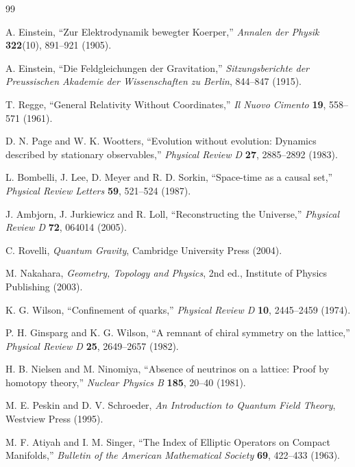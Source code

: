\documentclass[11pt,a4paper]{article}
\begin{document}
\begin{thebibliography}{99}

A. Einstein, ``Zur Elektrodynamik bewegter Koerper,'' \emph{Annalen der Physik} \textbf{322}(10), 891--921 (1905).

A. Einstein, ``Die Feldgleichungen der Gravitation,'' \emph{Sitzungsberichte der Preussischen Akademie der Wissenschaften zu Berlin}, 844--847 (1915).

T. Regge, ``General Relativity Without Coordinates,'' \emph{Il Nuovo Cimento} \textbf{19}, 558--571 (1961).

D. N. Page and W. K. Wootters, ``Evolution without evolution: Dynamics described by stationary observables,'' \emph{Physical Review D} \textbf{27}, 2885--2892 (1983).

L. Bombelli, J. Lee, D. Meyer and R. D. Sorkin, ``Space-time as a causal set,'' \emph{Physical Review Letters} \textbf{59}, 521--524 (1987).

J. Ambjorn, J. Jurkiewicz and R. Loll, ``Reconstructing the Universe,'' \emph{Physical Review D} \textbf{72}, 064014 (2005).

C. Rovelli, \emph{Quantum Gravity}, Cambridge University Press (2004).

M. Nakahara, \emph{Geometry, Topology and Physics}, 2nd ed., Institute of Physics Publishing (2003).

K. G. Wilson, ``Confinement of quarks,'' \emph{Physical Review D} \textbf{10}, 2445--2459 (1974).

P. H. Ginsparg and K. G. Wilson, ``A remnant of chiral symmetry on the lattice,'' \emph{Physical Review D} \textbf{25}, 2649--2657 (1982).

H. B. Nielsen and M. Ninomiya, ``Absence of neutrinos on a lattice: Proof by homotopy theory,'' \emph{Nuclear Physics B} \textbf{185}, 20--40 (1981).

M. E. Peskin and D. V. Schroeder, \emph{An Introduction to Quantum Field Theory}, Westview Press (1995).

M. F. Atiyah and I. M. Singer, ``The Index of Elliptic Operators on Compact Manifolds,'' \emph{Bulletin of the American Mathematical Society} \textbf{69}, 422--433 (1963).


\end{thebibliography}
\end{document}
